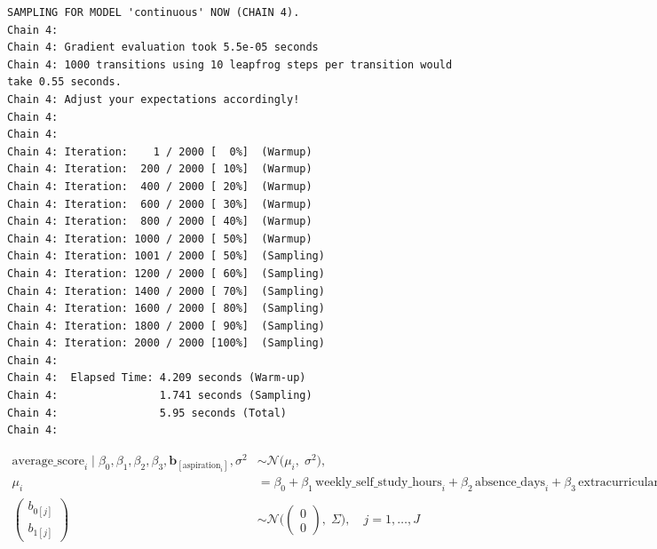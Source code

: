 \documentclass[
  letterpaper,
  DIV=11,
  numbers=noendperiod]{scrartcl}
\begin{document}
\begin{verbatim}
SAMPLING FOR MODEL 'continuous' NOW (CHAIN 4).
Chain 4: 
Chain 4: Gradient evaluation took 5.5e-05 seconds
Chain 4: 1000 transitions using 10 leapfrog steps per transition would take 0.55 seconds.
Chain 4: Adjust your expectations accordingly!
Chain 4: 
Chain 4: 
Chain 4: Iteration:    1 / 2000 [  0%]  (Warmup)
Chain 4: Iteration:  200 / 2000 [ 10%]  (Warmup)
Chain 4: Iteration:  400 / 2000 [ 20%]  (Warmup)
Chain 4: Iteration:  600 / 2000 [ 30%]  (Warmup)
Chain 4: Iteration:  800 / 2000 [ 40%]  (Warmup)
Chain 4: Iteration: 1000 / 2000 [ 50%]  (Warmup)
Chain 4: Iteration: 1001 / 2000 [ 50%]  (Sampling)
Chain 4: Iteration: 1200 / 2000 [ 60%]  (Sampling)
Chain 4: Iteration: 1400 / 2000 [ 70%]  (Sampling)
Chain 4: Iteration: 1600 / 2000 [ 80%]  (Sampling)
Chain 4: Iteration: 1800 / 2000 [ 90%]  (Sampling)
Chain 4: Iteration: 2000 / 2000 [100%]  (Sampling)
Chain 4: 
Chain 4:  Elapsed Time: 4.209 seconds (Warm-up)
Chain 4:                1.741 seconds (Sampling)
Chain 4:                5.95 seconds (Total)
Chain 4: 
\end{verbatim}

\[
\begin{aligned}
\text{average\_score}_i \;|\;\beta_0, \beta_1, \beta_2, \beta_3, \mathbf{b}_{[\text{aspiration}_i]}, \sigma^2
&\sim \mathcal{N}\bigl(\mu_i,\;\sigma^2\bigr), \\[4pt]
\mu_i &= \beta_0
         + \beta_1\,\text{weekly_self_study_hours}_i
         + \beta_2\,\text{absence_days}_i
         + \beta_3\,\text{extracurricular_activities}_i
         + b_{0[\text{aspiration}_i]}
         + b_{1[\text{aspiration}_i]}\,\text{weekly_self_study_hours}_i, \\[4pt]
\begin{pmatrix}
b_{0[j]} \\[2pt]
b_{1[j]}
\end{pmatrix}
&\sim \mathcal{N}\!\Biggl(\!
\begin{pmatrix}0\\0\end{pmatrix},\;
\Sigma\Biggr),
\quad j = 1,\dots,J
\end{aligned}
\]
\end{document}
